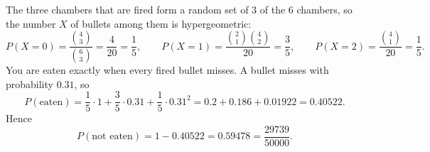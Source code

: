 The three chambers that are fired form a random set of $3$ of the $6$ chambers, so the number $X$ of bullets among them is hypergeometric:
\[
P(X=0)=\dfrac{\binom{4}{3}}{\binom{6}{3}}=\dfrac{4}{20}=\dfrac{1}{5},\qquad
P(X=1)=\dfrac{\binom{2}{1}\binom{4}{2}}{20}=\dfrac{3}{5},\qquad
P(X=2)=\dfrac{\binom{4}{1}}{20}=\dfrac{1}{5}.
\]
You are eaten exactly when every fired bullet misses. A bullet misses with probability $0.31$, so
\[
P(\text{eaten})=\dfrac{1}{5}\cdot1+\dfrac{3}{5}\cdot0.31+\dfrac{1}{5}\cdot0.31^2=0.2+0.186+0.01922=0.40522 .
\]
Hence
\[
P(\text{not eaten})=1-0.40522=\boxed{0.59478}=\dfrac{29739}{50000}.
\]
